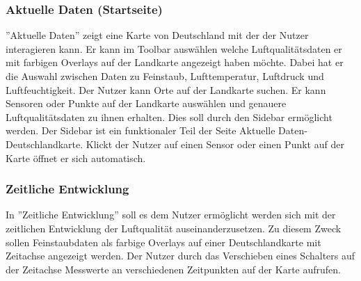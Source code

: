 \subsubsection{Aktuelle Daten (Startseite)}

''Aktuelle Daten'' zeigt eine Karte von Deutschland mit der der Nutzer interagieren kann. Er kann im Toolbar auswählen welche Luftqualitätsdaten er mit farbigen Overlays auf der Landkarte angezeigt haben möchte. Dabei hat er die Auswahl zwischen Daten zu Feinstaub, Lufttemperatur, Luftdruck und Luftfeuchtigkeit.
Der Nutzer kann Orte auf der Landkarte suchen. Er kann Sensoren oder Punkte auf der Landkarte auswählen und genauere Luftqualitätsdaten zu ihnen erhalten. Dies soll durch den Sidebar ermöglicht werden.
Der Sidebar ist ein funktionaler Teil der Seite Aktuelle Daten-Deutschlandkarte. Klickt der Nutzer auf einen Sensor oder einen Punkt auf der Karte öffnet er sich automatisch.


\subsubsection{Zeitliche Entwicklung}

In ''Zeitliche Entwicklung'' soll es dem Nutzer ermöglicht werden sich mit der zeitlichen Entwicklung der Luftqualität auseinanderzusetzen. Zu diesem Zweck sollen Feinstaubdaten als farbige Overlays auf einer Deutschlandkarte mit Zeitachse angezeigt werden. Der Nutzer durch das Verschieben eines Schalters auf der Zeitachse Messwerte an verschiedenen Zeitpunkten auf der Karte aufrufen.


